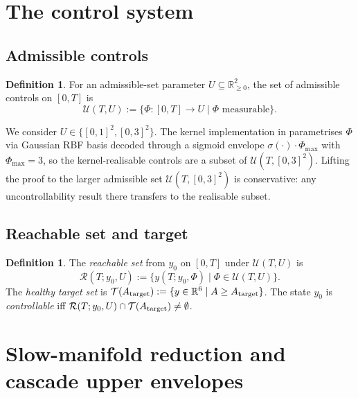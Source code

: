 \documentclass[11pt,a4paper]{article}
\theoremstyle{definition}
\newtheorem{definition}[theorem]{Definition}
\newcommand{\R}{\mathbb{R}}
\begin{document}
\section{The control system} \label{sec:control}

\subsection{Admissible controls}

\begin{definition}
For an admissible-set parameter $U \subseteq \R_{\ge 0}^2$, the set of admissible controls on $[0,T]$ is
\[
\mathcal{U}(T, U) := \big\{ \Phi : [0, T] \to U \mid \Phi \text{ measurable} \big\}.
\]
\end{definition}

We consider $U \in \{[0,1]^2, [0,3]^2\}$. The kernel implementation in  parametrises $\Phi$ via Gaussian RBF basis decoded through a sigmoid envelope $\sigma(\cdot)\cdot\Phi_{\max}$ with $\Phi_{\max} = 3$, so the kernel-realisable controls are a subset of $\mathcal{U}(T, [0,3]^2)$. Lifting the proof to the larger admissible set $\mathcal{U}(T, [0,3]^2)$ is conservative: any uncontrollability result there transfers to the realisable subset.

\subsection{Reachable set and target}

\begin{definition}
The \emph{reachable set} from $y_0$ on $[0,T]$ under $\mathcal{U}(T, U)$ is
\[
\mathcal{R}(T; y_0, U) := \big\{ y(T; y_0, \Phi) \mid \Phi \in \mathcal{U}(T, U) \big\}.
\]
The \emph{healthy target set} is $\mathcal{T}(A_{\rm target}) := \{y \in \R^6 \mid A \ge A_{\rm target}\}$. The state $y_0$ is \emph{controllable} iff $\mathcal{R}(T; y_0, U) \cap \mathcal{T}(A_{\rm target}) \ne \emptyset$.
\end{definition}

\section{Slow-manifold reduction and cascade upper envelopes} \label{sec:envelopes}
\end{document}
